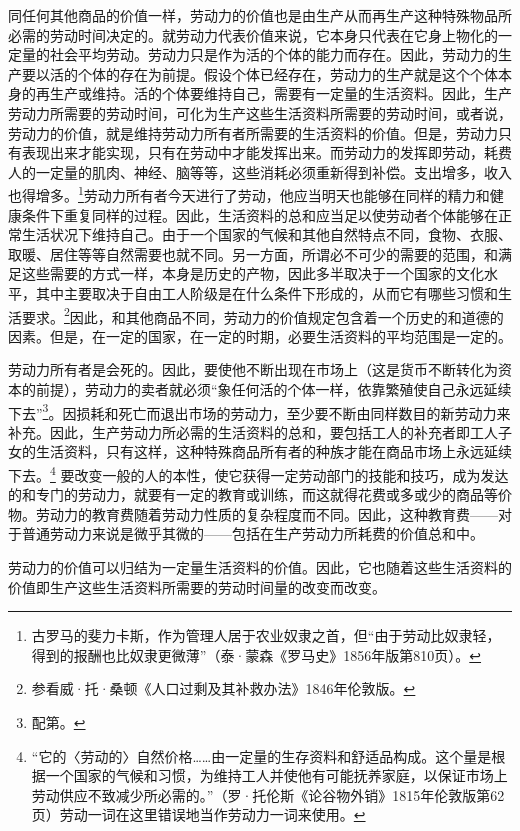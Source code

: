 \documentclass{ctexbook}
\begin{document}
    同任何其他商品的价值一样，劳动力的价值也是由生产从而再生产这种特殊物品所必需的劳动时间决定的。就劳动力代表价值来说，它本身只代表在它身上物化的一定量的社会平均劳动。劳动力只是作为活的个体的能力而存在。因此，劳动力的生产要以活的个体的存在为前提。假设个体已经存在，劳动力的生产就是这个个体本身的再生产或维持。活的个体要维持自己，需要有一定量的生活资料。因此，生产劳动力所需要的劳动时间，可化为生产这些生活资料所需要的劳动时间，或者说，劳动力的价值，就是维持劳动力所有者所需要的生活资料的价值。但是，劳动力只有表现出来才能实现，只有在劳动中才能发挥出来。而劳动力的发挥即劳动，耗费人的一定量的肌肉、神经、脑等等，这些消耗必须重新得到补偿。支出增多，收入也得增多。\footnote{古罗马的斐力卡斯，作为管理人居于农业奴隶之首，但“由于劳动比奴隶轻，得到的报酬也比奴隶更微薄”（泰·蒙森《罗马史》1856年版第810页）。}劳动力所有者今天进行了劳动，他应当明天也能够在同样的精力和健康条件下重复同样的过程。因此，生活资料的总和应当足以使劳动者个体能够在正常生活状况下维持自己。由于一个国家的气候和其他自然特点不同，食物、衣服、取暖、居住等等自然需要也就不同。另一方面，所谓必不可少的需要的范围，和满足这些需要的方式一样，本身是历史的产物，因此多半取决于一个国家的文化水平，其中主要取决于自由工人阶级是在什么条件下形成的，从而它有哪些习惯和生活要求。\footnote{参看威·托·桑顿《人口过剩及其补救办法》1846年伦敦版。}因此，和其他商品不同，劳动力的价值规定包含着一个历史的和道德的因素。但是，在一定的国家，在一定的时期，必要生活资料的平均范围是一定的。

    劳动力所有者是会死的。因此，要使他不断出现在市场上（这是货币不断转化为资本的前提），劳动力的卖者就必须“象任何活的个体一样，依靠繁殖使自己永远延续下去”\footnote{配第。}。因损耗和死亡而退出市场的劳动力，至少要不断由同样数目的新劳动力来补充。因此，生产劳动力所必需的生活资料的总和，要包括工人的补充者即工人子女的生活资料，只有这样，这种特殊商品所有者的种族才能在商品市场上永远延续下去。\footnote{“它的〈劳动的〉自然价格……由一定量的生存资料和舒适品构成。这个量是根据一个国家的气候和习惯，为维持工人并使他有可能抚养家庭，以保证市场上劳动供应不致减少所必需的。”（罗·托伦斯《论谷物外销》1815年伦敦版第62页）劳动一词在这里错误地当作劳动力一词来使用。}
    要改变一般的人的本性，使它获得一定劳动部门的技能和技巧，成为发达的和专门的劳动力，就要有一定的教育或训练，而这就得花费或多或少的商品等价物。劳动力的教育费随着劳动力性质的复杂程度而不同。因此，这种教育费——对于普通劳动力来说是微乎其微的——包括在生产劳动力所耗费的价值总和中。

    劳动力的价值可以归结为一定量生活资料的价值。因此，它也随着这些生活资料的价值即生产这些生活资料所需要的劳动时间量的改变而改变。
\end{document}
